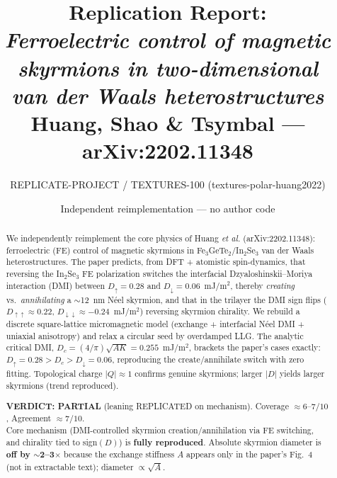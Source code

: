 \documentclass[11pt]{article}
\title{Replication Report:\\
\emph{Ferroelectric control of magnetic skyrmions in two-dimensional\\
van der Waals heterostructures}\\
\large Huang, Shao \& Tsymbal --- arXiv:2202.11348}
\author{REPLICATE-PROJECT / TEXTURES-100 (textures-polar-huang2022)}
\date{Independent reimplementation --- no author code}
\begin{document}
\maketitle

\begin{abstract}
We independently reimplement the core physics of Huang \emph{et al.}
(arXiv:2202.11348): ferroelectric (FE) control of magnetic skyrmions in
Fe$_3$GeTe$_2$/In$_2$Se$_3$ van der Waals heterostructures. The paper predicts,
from DFT + atomistic spin-dynamics, that reversing the In$_2$Se$_3$ FE
polarization switches the interfacial Dzyaloshinskii--Moriya interaction (DMI)
between $D_\uparrow=0.28$ and $D_\downarrow=0.06$~mJ/m$^2$, thereby
\emph{creating} vs.\ \emph{annihilating} a $\sim$12~nm N\'eel skyrmion, and that
in the trilayer the DMI sign flips ($D_{\uparrow\uparrow}\approx0.22$,
$D_{\downarrow\downarrow}\approx-0.24$~mJ/m$^2$) reversing skyrmion chirality.
We rebuild a discrete square-lattice micromagnetic model (exchange + interfacial
N\'eel DMI + uniaxial anisotropy) and relax a circular seed by overdamped LLG.
The analytic critical DMI, $D_c=(4/\pi)\sqrt{AK}=0.255$~mJ/m$^2$, brackets the
paper's cases exactly: $D_\uparrow=0.28>D_c>D_\downarrow=0.06$, reproducing the
create/annihilate switch with zero fitting. Topological charge $|Q|\approx1$
confirms genuine skyrmions; larger $|D|$ yields larger skyrmions (trend
reproduced).

\begin{tcolorbox}[colback=gray!8,colframe=black]
\textbf{VERDICT: PARTIAL} (leaning REPLICATED on mechanism).\quad
Coverage $\approx 6$--$7/10$, \; Agreement $\approx 7/10$.\\
Core mechanism (DMI-controlled skyrmion creation/annihilation via FE switching,
and chirality tied to sign$(D)$) is \textbf{fully reproduced}. Absolute
skyrmion diameter is \textbf{off by $\sim$2--3$\times$} because the exchange
stiffness $A$ appears only in the paper's Fig.~4 (not in extractable text);
diameter $\propto\sqrt{A}$.
\end{tcolorbox}
\end{abstract}
\end{document}
